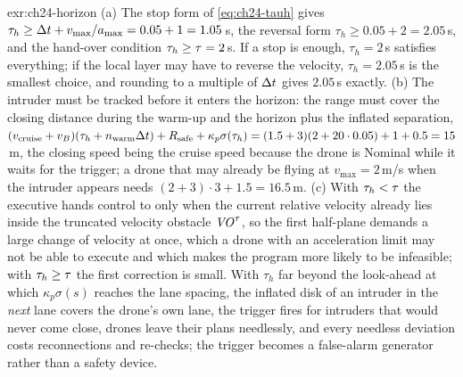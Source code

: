 
\begin{solution}{exr:ch24-horizon}
(a) The stop form of \cref{eq:ch24-tauh} gives $\tau_h \ge \Delta t + v_{\max}/a_{\max} = 0.05 + 1 = 1.05$\,s, the reversal form $\tau_h \ge 0.05 + 2 = 2.05$\,s, and the hand-over condition $\tau_h \ge \tau = 2$\,s. If a stop is enough, $\tau_h = 2$\,s satisfies everything; if the local layer may have to reverse the velocity, $\tau_h = 2.05$\,s is the smallest choice, and rounding to a multiple of $\Delta t$ gives $2.05$\,s exactly. (b) The intruder must be tracked before it enters the horizon: the range must cover the closing distance during the warm-up and the horizon plus the inflated separation, $(v_{\mathrm{cruise}} + v_B)(\tau_h + n_{\mathrm{warm}}\Delta t) + R_{\mathrm{safe}} + \kappa_p\sigma(\tau_h) = (1.5 + 3)(2 + 20 \cdot 0.05) + 1 + 0.5 = 15$\,m, the closing speed being the cruise speed because the drone is Nominal while it waits for the trigger; a drone that may already be flying at $v_{\max} = 2$\,m/s when the intruder appears needs $(2 + 3) \cdot 3 + 1.5 = 16.5$\,m. (c) With $\tau_h < \tau$ the executive hands control to \orca only when the current relative velocity already lies inside the truncated velocity obstacle $\mathit{VO}^{\tau}$, so the first half-plane demands a large change of velocity at once, which a drone with an acceleration limit may not be able to execute and which makes the program more likely to be infeasible; with $\tau_h \ge \tau$ the first correction is small. With $\tau_h$ far beyond the look-ahead at which $\kappa_p\sigma(s)$ reaches the lane spacing, the inflated disk of an intruder in the \emph{next} lane covers the drone's own lane, the trigger fires for intruders that would never come close, drones leave their plans needlessly, and every needless deviation costs reconnections and re-checks; the trigger becomes a false-alarm generator rather than a safety device.
\end{solution}

